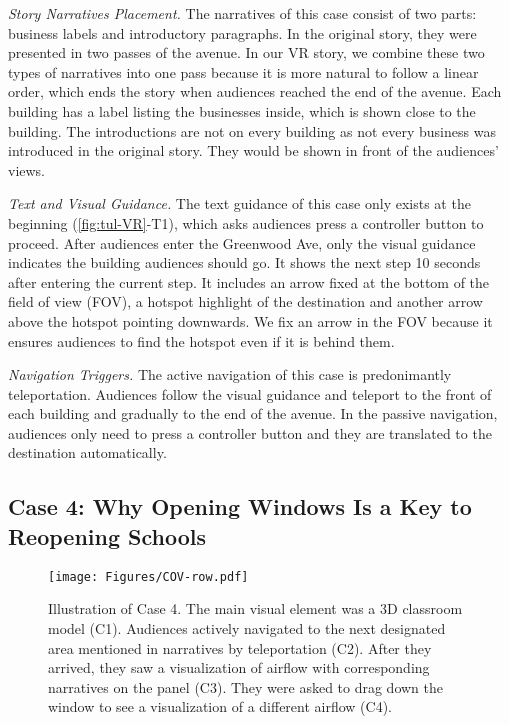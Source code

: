 \textit{Story Narratives Placement.} The narratives of this case consist of two parts: business labels and introductory paragraphs. In the original story, they were presented in two passes of the avenue. In our VR story, we combine these two types of narratives into one pass because it is more natural to follow a linear order, which ends the story when audiences reached the end of the avenue. Each building has a label listing the businesses inside, which is shown close to the building. The introductions are not on every building as not every business was introduced in the original story. They would be shown in front of the audiences' views.

\textit{Text and Visual Guidance.} The text guidance of this case only exists at the beginning (\autoref{fig:tul-VR}-T1), which asks audiences press a controller button to proceed. After audiences enter the Greenwood Ave, only the visual guidance indicates the building audiences should go. It shows the next step 10 seconds after entering the current step. It includes an arrow fixed at the bottom of the field of view (FOV), a hotspot highlight of the destination and another arrow above the hotspot pointing downwards. We fix an arrow in the FOV because it ensures audiences to find the hotspot even if it is behind them.

\textit{Navigation Triggers.} The active navigation of this case is predonimantly teleportation. Audiences follow the visual guidance and teleport to the front of each building and gradually to the end of the avenue. In the passive navigation, audiences only need to press a controller button and they are translated to the destination automatically.



\subsection{Case 4: Why Opening Windows Is a Key to Reopening Schools}
\label{subsec:case4}
\begin{figure*}[t]
\centering
  \texttt{[image: Figures/COV-row.pdf]}
  \caption{Illustration of Case 4. The main visual element was a 3D classroom model (C1). Audiences actively navigated to the next designated area mentioned in narratives by teleportation (C2). After they arrived, they saw a visualization of airflow with corresponding narratives on the panel (C3). They were asked to drag down the window to see a visualization of a different airflow (C4).}
  \label{fig:cov-VR}
\end{figure*}

